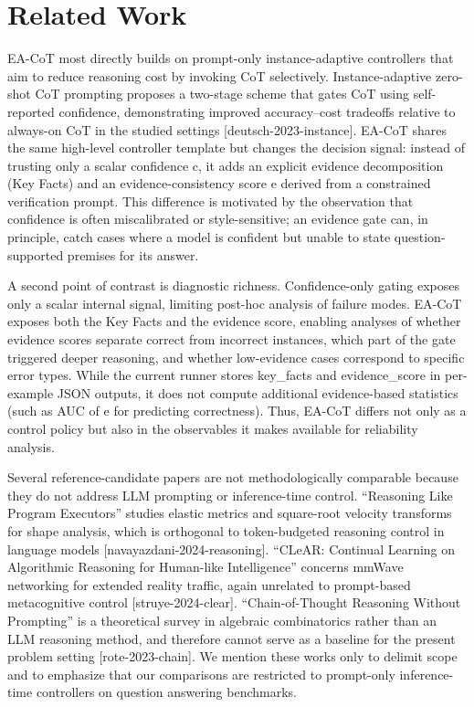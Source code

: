 \documentclass[journal,article,submit,pdftex,moreauthors]{Definitions/mdpi}
\begin{document}
\section{Related Work}

EA-CoT most directly builds on prompt-only instance-adaptive controllers that aim to reduce reasoning cost by invoking CoT selectively. Instance-adaptive zero-shot CoT prompting proposes a two-stage scheme that gates CoT using self-reported confidence, demonstrating improved accuracy–cost tradeoffs relative to always-on CoT in the studied settings [deutsch-2023-instance]. EA-CoT shares the same high-level controller template but changes the decision signal: instead of trusting only a scalar confidence c, it adds an explicit evidence decomposition (Key Facts) and an evidence-consistency score e derived from a constrained verification prompt. This difference is motivated by the observation that confidence is often miscalibrated or style-sensitive; an evidence gate can, in principle, catch cases where a model is confident but unable to state question-supported premises for its answer.

A second point of contrast is diagnostic richness. Confidence-only gating exposes only a scalar internal signal, limiting post-hoc analysis of failure modes. EA-CoT exposes both the Key Facts and the evidence score, enabling analyses of whether evidence scores separate correct from incorrect instances, which part of the gate triggered deeper reasoning, and whether low-evidence cases correspond to specific error types. While the current runner stores key\_facts and evidence\_score in per-example JSON outputs, it does not compute additional evidence-based statistics (such as AUC of e for predicting correctness). Thus, EA-CoT differs not only as a control policy but also in the observables it makes available for reliability analysis.

Several reference-candidate papers are not methodologically comparable because they do not address LLM prompting or inference-time control. “Reasoning Like Program Executors” studies elastic metrics and square-root velocity transforms for shape analysis, which is orthogonal to token-budgeted reasoning control in language models [navayazdani-2024-reasoning]. “CLeAR: Continual Learning on Algorithmic Reasoning for Human-like Intelligence” concerns mmWave networking for extended reality traffic, again unrelated to prompt-based metacognitive control [struye-2024-clear]. “Chain-of-Thought Reasoning Without Prompting” is a theoretical survey in algebraic combinatorics rather than an LLM reasoning method, and therefore cannot serve as a baseline for the present problem setting [rote-2023-chain]. We mention these works only to delimit scope and to emphasize that our comparisons are restricted to prompt-only inference-time controllers on question answering benchmarks.
\end{document}
